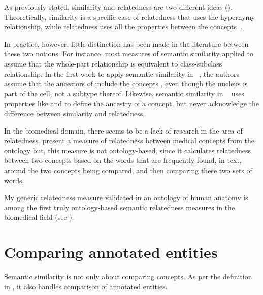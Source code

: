 As previously stated, similarity and relatedness are two different ideas (). Theoretically, similarity is a specific case of relatedness that uses the hypernymy relationship, while relatedness uses all the properties between the concepts~\citep{Pedersen2007}.

In practice, however, little distinction has been made in the literature between these two notions. For instance, most measures of semantic similarity applied to  assume that the whole-part relationship is equivalent to class-subclass relationship. In the first work to apply semantic similarity in ~\citep{Lord2003}, the authors assume that the ancestors of  include the concepts , even though the nucleus is part of the cell, not a subtype thereof. Likewise, semantic similarity in ~\citep{Grego2010,Ferreira2010} uses properties like  and  to define the ancestry of a concept, but never acknowledge the difference between similarity and relatedness.

In the biomedical domain, there seems to be a lack of research in the area of relatedness. \citet{Pedersen2007} present a measure of relatedness between medical concepts from the  ontology but, this measure is not ontology-based, since it calculates relatedness between two concepts based on the words that are frequently found, in text, around the two concepts being compared, and then comparing these two sets of words.

My generic relatedness measure validated in an ontology of human anatomy is among the first truly ontology-based semantic relatedness measures in the biomedical field (see ).


\section{Comparing annotated entities} \label{sec:sota/annotated}


Semantic similarity is not only about comparing concepts. As per the definition in , it also handles comparison of annotated entities.

